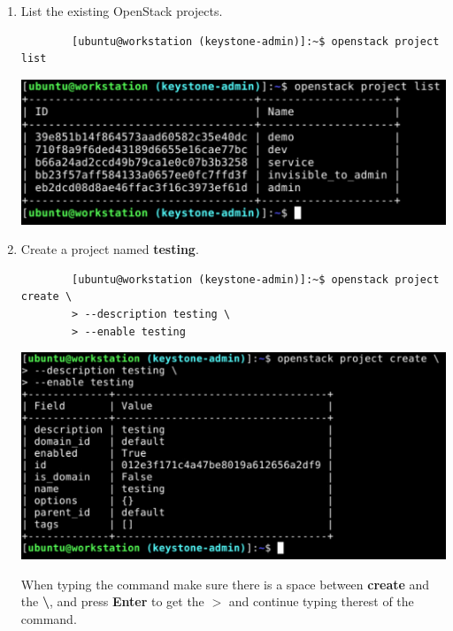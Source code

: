 \documentclass[letterpaper, 12pt]{article}
\begin{document}
\begin{enumerate}
    \item List the existing OpenStack projects.
    \begin{lstlisting}
        [ubuntu@workstation (keystone-admin)]:~$ openstack project list
    \end{lstlisting}

    \begin{center}
        \includegraphics[width=\linewidth]{images/part2/step3.png}
    \end{center}

    \item Create a project named \textbf{testing}.
    \begin{lstlisting}
        [ubuntu@workstation (keystone-admin)]:~$ openstack project create \
        > --description testing \
        > --enable testing
    \end{lstlisting}

    \begin{center}
        \includegraphics[width=\linewidth]{images/part2/step4.png}
    \end{center}

    \begin{tipbox}
        When typing the command make sure there is a space between \textbf{create} and the \textbf{\textbackslash}, and
        press \textbf{Enter} to get the \textbf{$>$} and continue typing therest of the command.
    \end{tipbox}


\end{enumerate}
\end{document}
